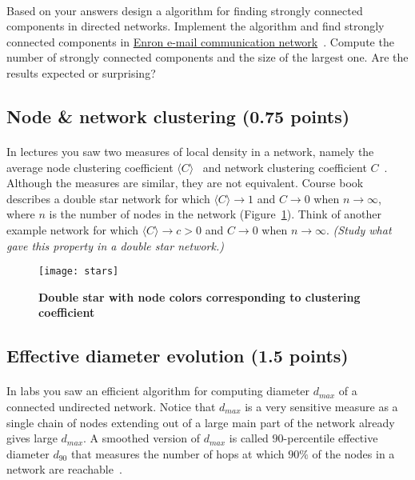 \documentclass[11pt,a4paper]{article}
\newcommand{\avg}[1]{\langle#1\rangle}
\newcommand{\hint}[1]{{\it (#1)}}
\newcommand{\totals}[1]{({\color{magenta}#1 points})}
\newcommand{\figref}[1]{{\color{LimeGreen}Figure~\ref{fig:#1}}}
\begin{document}
\paragraph{} Based on your answers design a algorithm for finding strongly connected components in directed networks. Implement the algorithm and find strongly connected components in \href{http://lovro.lpt.fri.uni-lj.si/ina/nets/enron}{Enron e-mail communication network}~\cite{KY04}. Compute the number of strongly connected components and the size of the largest one. Are the results expected or surprising?

\subsection{Node \& network clustering \totals{0.75}}

\paragraph{} In lectures you saw two measures of local density in a network, namely the average node clustering coefficient $\avg{C}$~\cite{WS98} and network clustering coefficient $C$~\cite{NSW01}. Although the measures are similar, they are not equivalent. Course book~\cite{Bar16} describes a double star network for which $\avg{C}\rightarrow 1$ and $C\rightarrow 0$ when $n\rightarrow\infty$, where $n$ is the number of nodes in the network (\figref{stars}). Think of another example network for which $\avg{C}\rightarrow c>0$ and $C\rightarrow 0$ when $n\rightarrow\infty$. \hint{Study what gave this property in a double star network.}

\begin{figure}[h] \centering
	\texttt{[image: stars]}
	\caption{{\bf Double star with node colors corresponding to clustering coefficient}}
	\label{fig:stars}
\end{figure}

\subsection{Effective diameter evolution \totals{1.5}}

\paragraph{} In labs you saw an efficient algorithm for computing diameter $d_{max}$ of a connected undirected network.
Notice that $d_{max}$ is a very sensitive measure as a single chain of nodes extending out of a large main part of the network already gives large $d_{max}$. A smoothed version of $d_{max}$ is called $90$-percentile effective diameter $d_{90}$ that measures the number of hops at which $90\%$ of the nodes in a network are reachable~\cite{LKF07}. 
\end{document}
